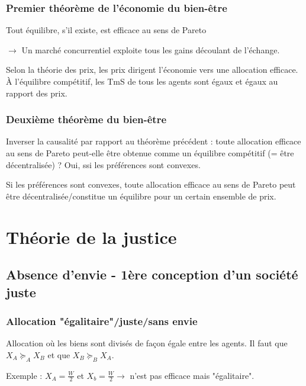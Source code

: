 \subsubsection{Premier théorème de l'économie du bien-être}

\begin{formal}
Tout équilibre, s'il existe, est efficace au sens de Pareto
\end{formal}

$\rightarrow$ Un marché concurrentiel exploite tous les gains découlant de l'échange.

Selon la théorie des prix, les prix dirigent l'économie vers une allocation efficace. À l'équilibre compétitif, les TmS de tous les agents sont égaux et égaux au rapport des prix.

\subsubsection{Deuxième théorème du bien-être}

Inverser la causalité par rapport au théorème précédent : toute allocation efficace au sens de Pareto peut-elle être obtenue comme un équilibre compétitif (= être décentralisée) ? Oui, ssi les préférences sont convexes.
\begin{formal}
Si les préférences sont convexes, toute allocation efficace au sens de Pareto peut être décentralisée/constitue un équilibre pour un certain ensemble de prix.
\end{formal}

\section{Théorie de la justice}

\subsection{Absence d'envie - 1ère conception d'un société juste}

\subsubsection{Allocation "égalitaire"/juste/sans envie}
Allocation où les biens sont divisés de façon égale entre les agents. Il faut que $X_A \succeq_A X_B$ et que $X_B \succeq_B X_A$.

Exemple : $X_A = \frac{W}{2}$ et $X_b = \frac{W}{2} \rightarrow$ n'est pas efficace mais "égalitaire".


